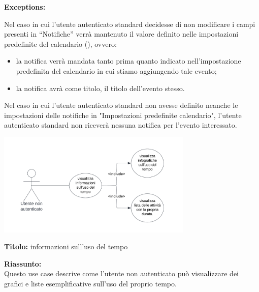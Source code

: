 \begin{listaPersonale}[UC]{}
    \textbf{Exceptions:}
    \begin{enumerate}[label=\textbf{[exception \arabic{enumii}]}, ref= \textbf{[exception \arabic{enumii}]}]
         Nel caso in cui l'utente autenticato standard decidesse di non modificare i campi presenti in “Notifiche” verrà mantenuto il valore definito nelle impostazioni predefinite del calendario (), ovvero:
        \begin{itemize}
            \item la notifica verrà mandata tanto prima quanto indicato nell'impostazione predefinita del calendario in cui stiamo aggiungendo tale evento;
            \item la notifica avrà come titolo, il titolo dell'evento stesso.
        \end{itemize}
         Nel caso in cui l'utente autenticato standard non avesse definito neanche le impostazioni delle notifiche in "Impostazioni predefinite calendario", l'utente autenticato standard non riceverà nessuna notifica per l'evento interessato.
    \end{enumerate}




    



    \newpage


    \begin{center}
        \includegraphics[width=0.7\textwidth]{img/Diagrammi/UseCases/UsoDelTempo.png}
    \end{center}

    \textbf{Titolo:} informazioni sull'uso del tempo

    \textbf{Riassunto:} \\
    Questo use case descrive come l'utente non autenticato può visualizzare dei grafici e liste esemplificative sull'uso del proprio tempo.


\end{listaPersonale}
